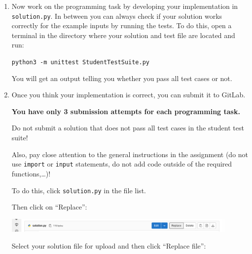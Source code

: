 \documentclass{scrartcl}
\begin{document}
\begin{enumerate}
		\vfill
		
		\pagebreak
		
		\item Now work on the programming task by developing your implementation in \texttt{solution.py}. In between you can always check if your solution works correctly for the example inputs by running the tests. To do this, open a terminal in the directory where your solution and test file are located and run:
		
		\vfill
		
		\texttt{python3 -m unittest StudentTestSuite.py}
		
		\vfill
		
		You will get an output telling you whether you pass all test cases or not.
		
		\vfill
		
		\item Once you think your implementation is correct, you can submit it to GitLab.
		
		\vfill
		
		\begin{tcolorbox}[title=\faExclamationCircle\space Caution,colbacktitle=red!75,colframe=red!75]
			\bfseries You have only 3 submission attempts for each programming task.

			Do not submit a solution that does not pass all test cases in the student test suite!
			
			Also, pay close attention to the general instructions in the assignment (do not use \texttt{import} or \texttt{input} statements, do not add code outside of the required functions,\ldots)!
		\end{tcolorbox}
	
		\vfill
	
		To do this, click \texttt{solution.py} in the file list. 

		Then click on \enquote{Replace}:
		
		\vfill
		
		\includegraphics[width=0.9\textwidth]{img/screenshot-replace-button.png}
		
		\vfill
		
		Select your solution file for upload and then click \enquote{Replace file}:
		
		\vfill
		

\end{enumerate}
\end{document}
